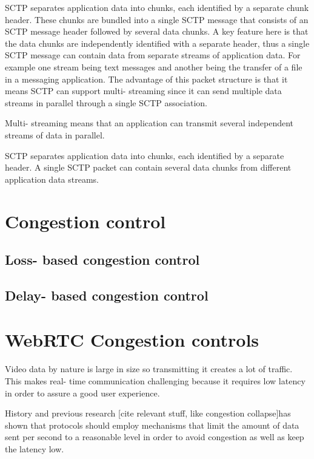 \documentclass[UKenglish]{ifimaster}
\begin{document}
SCTP separates application data into chunks, each identified by a separate chunk header. 
These chunks are bundled into a single SCTP message that consists of an SCTP message header followed by several data chunks.
A key feature here is that the data chunks are independently identified with a separate header, thus a single SCTP message can contain data from separate streams of application data. For example one stream being text messages and another being the transfer of a file in a messaging application.
The advantage of this packet structure is that it means SCTP can support multi- streaming since it can send multiple data streams in parallel through a single SCTP association. 

Multi- streaming means that an application can transmit several independent streams of data in parallel. 

SCTP separates application data into chunks, each identified by a separate header. 
A single SCTP packet can contain several data chunks from different application data streams.


\section{Congestion control}
\subsection{Loss- based congestion control}
\subsection{Delay- based congestion control}
\section{WebRTC Congestion controls}
Video data by nature is large in size so transmitting it creates a lot of traffic. 
This makes real- time communication challenging because it requires low latency in order to assure a good user experience. 

History and previous research [cite relevant stuff, like congestion collapse]has shown that protocols should employ mechanisms that limit the amount of data sent per second to a reasonable level in order to avoid congestion as well as keep the latency low.
\end{document}
